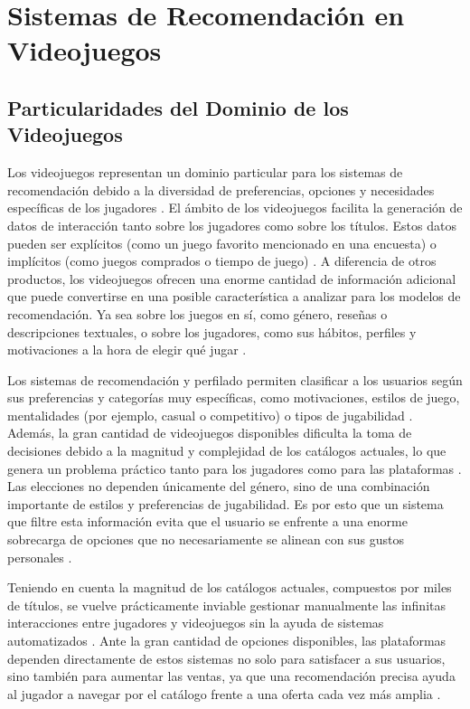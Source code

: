 \section{Sistemas de Recomendación en Videojuegos}\label{sec:recomendacion_videojuegos}

\subsection{Particularidades del Dominio de los Videojuegos}\label{subsec:particularidades_videojuegos}

Los videojuegos representan un dominio particular para los sistemas de recomendación debido a la diversidad de preferencias, opciones y necesidades específicas de los jugadores \parencite{CheuqueEtAl2019, ViljanenEtAl2020}. El ámbito de los videojuegos facilita la generación de datos de interacción tanto sobre los jugadores como sobre los títulos. Estos datos pueden ser explícitos (como un juego favorito mencionado en una encuesta) o implícitos (como juegos comprados o tiempo de juego) \parencite{ViljanenEtAl2020, CheuqueEtAl2019}. A diferencia de otros productos, los videojuegos ofrecen una enorme cantidad de información adicional que puede convertirse en una posible característica a analizar para los modelos de recomendación. Ya sea sobre los juegos en sí, como género, reseñas o descripciones textuales, o sobre los jugadores, como sus hábitos, perfiles y motivaciones a la hora de elegir qué jugar \parencite{ViljanenEtAl2020}.

Los sistemas de recomendación y perfilado permiten clasificar a los usuarios según sus preferencias y categorías muy específicas, como motivaciones, estilos de juego, mentalidades (por ejemplo, casual o competitivo) o tipos de jugabilidad \parencite{ViljanenEtAl2020}. Además, la gran cantidad de videojuegos disponibles dificulta la toma de decisiones debido a la magnitud y complejidad de los catálogos actuales, lo que genera un problema práctico tanto para los jugadores como para las plataformas \parencite{LeeJung2019, CheuqueEtAl2019}. Las elecciones no dependen únicamente del género, sino de una combinación importante de estilos y preferencias de jugabilidad. Es por esto que un sistema que filtre esta información evita que el usuario se enfrente a una enorme sobrecarga de opciones que no necesariamente se alinean con sus gustos personales \parencite{CheuqueEtAl2019}.

Teniendo en cuenta la magnitud de los catálogos actuales, compuestos por miles de títulos, se vuelve prácticamente inviable gestionar manualmente las infinitas interacciones entre jugadores y videojuegos sin la ayuda de sistemas automatizados \parencite{LeeJung2019, CheuqueEtAl2019}. Ante la gran cantidad de opciones disponibles, las plataformas dependen directamente de estos sistemas no solo para satisfacer a sus usuarios, sino también para aumentar las ventas, ya que una recomendación precisa ayuda al jugador a navegar por el catálogo frente a una oferta cada vez más amplia \parencite{ViljanenEtAl2020, CheuqueEtAl2019}.

